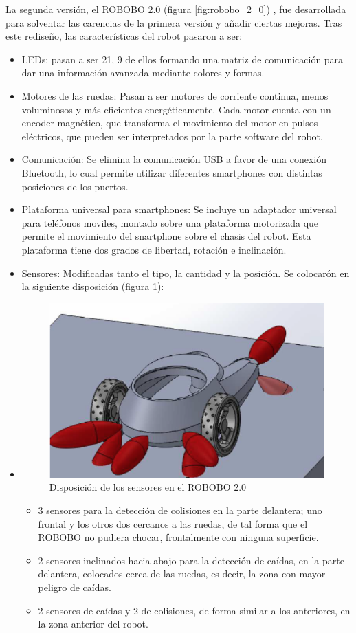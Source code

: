 La segunda versión, el ROBOBO 2.0 (figura \ref{fig:robobo_2_0}) , fue desarrollada para solventar las carencias de la primera versión y añadir ciertas mejoras. Tras este rediseño, las características del robot pasaron a ser:

\begin{itemize}
	\item LEDs: pasan a ser 21, 9 de ellos formando una matriz de comunicación para dar una información avanzada mediante colores y formas.
	\item Motores de las ruedas: Pasan a ser motores de corriente continua, menos voluminosos y más eficientes energéticamente. Cada motor cuenta con un encoder magnético, que transforma el movimiento del motor en pulsos eléctricos, que pueden ser interpretados por la parte software del robot.
	\item Comunicación: Se elimina la comunicación USB a favor de una conexión Bluetooth, lo cual permite utilizar diferentes smartphones con distintas posiciones de los puertos.
	\item Plataforma universal para smartphones: Se incluye un adaptador universal para teléfonos moviles, montado sobre una plataforma motorizada que permite el movimiento del snartphone sobre el chasis del robot. Esta plataforma tiene dos grados de libertad, rotación e inclinación.
	\item Sensores: Modificadas tanto el tipo, la cantidad y la posición. Se colocarón en la siguiente disposición (figura \ref{fig:robobo_2_0_sensors}):
	\item \begin{figure}
	\centering
	\includegraphics[width=0.8\linewidth]{imagenes/robobo_2_sensors.png}
	\caption{Disposición de los sensores en el ROBOBO 2.0}
	\label{fig:robobo_2_0_sensors}
\end{figure} 
	\begin{itemize}
	\item 3 sensores para la detección de colisiones en la parte delantera; uno frontal y los otros dos cercanos a las ruedas, de tal forma que el ROBOBO no pudiera chocar, frontalmente con ninguna superficie.
	\item 2 sensores inclinados hacia abajo para la detección de caídas, en la parte delantera, colocados cerca de las ruedas, es decir, la zona con mayor peligro de caídas.
	\item 2 sensores de caídas y 2 de colisiones, de forma similar a los anteriores, en la zona anterior del robot. 
	

\end{itemize}
\end{itemize}
